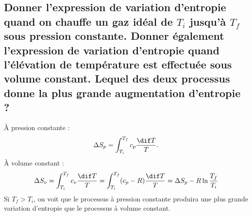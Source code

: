 \subsection{Donner l'expression de variation d'entropie
quand on chauffe un gaz idéal de $T_i$ jusqu'à $T_f$ sous pression constante.
Donner également l'expression de variation d'entropie quand l'élévation de température
est effectuée sous volume constant.
Lequel des deux processus donne la plus grande augmentation d'entropie ?\label{q:2_2}}
À pression constante :
\[ \Delta S_p = \int_{T_i}^{T_f} c_p \frac{\dif T}{T}. \]
À volume constant :
\[ \Delta S_v = \int_{T_i}^{T_f} c_v \frac{\dif T}{T} 
= \int_{T_i}^{T_f} (c_p-R) \frac{\dif T}{T} = \Delta S_p - R\ln\frac{T_f}{T_i} \]
Si $T_f > T_i$, on voit que le processus à pression constante produira une plus grande
variation d'entropie que le processus à volume constant.

